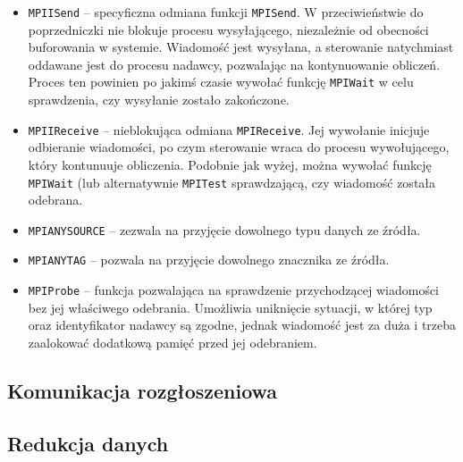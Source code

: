 \begin{itemize}
	\item \texttt{MPI\textunderscore ISend} -- specyficzna odmiana funkcji \texttt{MPI\textunderscore Send}. W przeciwieństwie do poprzedniczki nie blokuje procesu wysyłającego, niezależnie od obecności buforowania w systemie. Wiadomość jest wysyłana, a sterowanie natychmiast oddawane jest do procesu nadawcy, pozwalając na kontynuowanie obliczeń. Proces ten powinien po jakimś czasie wywołać funkcję \texttt{MPI\textunderscore Wait} w celu sprawdzenia, czy wysyłanie zostało zakończone.
	\item \texttt{MPI\textunderscore IReceive} -- nieblokująca odmiana
	\texttt{MPI\textunderscore Receive}. Jej wywołanie inicjuje odbieranie wiadomości, po czym sterowanie wraca do procesu wywołującego, który kontunuuje obliczenia. Podobnie jak wyżej, można wywołać funkcję \texttt{MPI\textunderscore Wait} (lub alternatywnie \texttt{MPI\textunderscore Test} sprawdzającą, czy wiadomość została odebrana.
	\item \texttt{MPI\textunderscore ANY\textunderscore SOURCE} -- zezwala na przyjęcie dowolnego typu danych ze źródła.
	\item \texttt{MPI\textunderscore ANY\textunderscore TAG} -- pozwala na przyjęcie dowolnego znacznika ze źródła.
	\item \texttt{MPI\textunderscore Probe} -- funkcja pozwalająca na sprawdzenie przychodzącej wiadomości bez jej właściwego odebrania. Umożliwia uniknięcie sytuacji, w której typ oraz identyfikator nadawcy są zgodne, jednak wiadomość jest za duża i trzeba zaalokować dodatkową pamięć przed jej odebraniem.
	
\end{itemize}

\subsection{Komunikacja rozgłoszeniowa}

\subsection{Redukcja danych}

